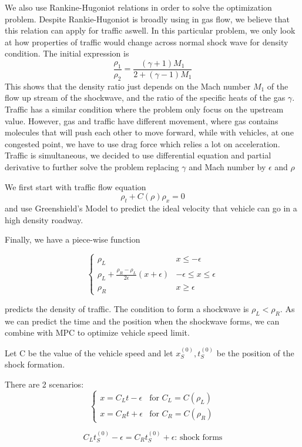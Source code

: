\documentclass{article}
\begin{document}
We also use Rankine-Hugoniot relations in order to solve the optimization problem. Despite Rankie-Hugoniot is broadly using in gas flow, we believe that this relation can apply for traffic aswell. In this particular problem, we only look at how properties of traffic would change across normal shock wave for density condition. The initial expression is $$\frac{\rho_{1}}{\rho_{2}}=\frac{(\gamma +1)M_{1}}{2+(\gamma -1)M_{1}}$$ This shows that the density ratio just depends on the Mach number $M_{1}$ of the flow up stream of the shockwave, and the ratio of the specific heats of the gas $\gamma$. Traffic has a similar condition where the problem only focus on the upstream value. However, gas and traffic have different movement, where gas contains molecules that will push each other to move forward, while with vehicles, at one congested point, we have to use drag force which relies a lot on acceleration. Traffic is simultaneous, we decided to use differential equation and partial derivative to further solve the problem replacing $\gamma$ and Mach number by $\epsilon$ and $\rho$


We first start with traffic flow equation $$\rho_{t}+C(\rho)\rho_{x}=0$$ and use Greenshield's Model to predict the ideal velocity that vehicle can go in a high density roadway. 

Finally, we have a piece-wise function 

\[ \begin{cases} 
      \rho_{L} & x \leq -\epsilon \\
      \rho_{L} + \frac{\rho_{R}-\rho_{L}}{2\epsilon}(x+\epsilon) & -\epsilon \leq x\leq \epsilon \\ 
      \rho_{R} & x \ge \epsilon 
   \end{cases}
\]

\noindent predicts the density of traffic. The condition to form a shockwave is $\rho_L < \rho_R$. As we can predict the time and the position when the shockwave forms, we can combine with MPC to optimize vehicle speed limit. 

Let C be the value of the vehicle speed and let $x_S^{(0)}, t_S^{(0)}$ be the position of the shock formation. 

There are 2 scenarios: 
\[ \begin{cases} 
      x=C_Lt - \epsilon & \text{for } C_L = C(\rho_L) \\
      x=C_Rt+ \epsilon & \text{for } C_R = C(\rho_R)
   \end{cases}
\]

$$C_L t_S^{(0)} - \epsilon = C_R t_S^{(0)} + \epsilon \text{: shock forms}$$
\end{document}

